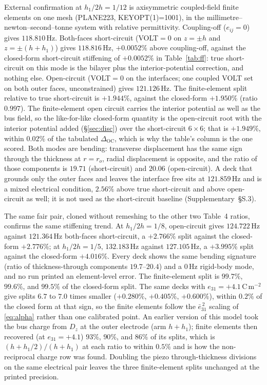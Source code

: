 \documentclass[11pt]{article}
\newcommand{\eebar}{\bar{e}_{31}}
\begin{document}
External confirmation at $h_1/2h=1/12$ is axisymmetric coupled-field
finite elements on one mesh (PLANE223, KEYOPT(1)=1001), in the
millimetre--newton--second--tonne system with relative permittivity.
Coupling-off ($e_{ij}=0$) gives $118.810\,\mathrm{Hz}$. Both-faces
short-circuit (VOLT$=0$ on $z=\pm h$ and $z=\pm(h+h_1)$) gives
$118.816\,\mathrm{Hz}$, $+0.0052\%$ above coupling-off, against the
closed-form short-circuit stiffening of $+0.0052\%$ in
Table~\ref{tab:ff}: true short-circuit on this mode is the bilayer plus
the interior-potential correction, and nothing else.
Open-circuit (VOLT$=0$ on the interfaces; one coupled VOLT set on both
outer faces, unconstrained) gives $121.126\,\mathrm{Hz}$. The
finite-element split relative to true short-circuit is $+1.944\%$,
against the closed-form $+1.950\%$ (ratio $0.997$). The finite-element
open circuit carries the interior potential as well as the bus field, so
the like-for-like closed-form quantity is the open-circuit root with the
interior potential added (\S\ref{sec:disc}) over the short-circuit
$6\times6$; that is $+1.949\%$, within $0.02\%$ of the tabulated
$\Delta_{\mathrm{OC}}$, which is why the table's column is the one
scored. Both modes are bending:
transverse displacement has the same sign through the thickness at
$r=r_o$, radial displacement is opposite, and the ratio of those
components is $19.71$ (short-circuit) and $20.06$ (open-circuit). A deck
that grounds only the outer faces and leaves the interface free sits at
$121.859\,\mathrm{Hz}$ and is a mixed electrical condition, $2.56\%$
above true short-circuit and above open-circuit as well; it is not used
as the short-circuit baseline (Supplementary~\S S.3).

The same fair pair, cloned without remeshing to the other two Table~4
ratios, confirms the same stiffening trend. At $h_1/2h=1/8$,
open-circuit gives $124.722\,\mathrm{Hz}$ against $121.364\,\mathrm{Hz}$
both-faces short-circuit, a $+2.766\%$ split against the closed-form
$+2.776\%$; at $h_1/2h=1/5$, $132.183\,\mathrm{Hz}$ against
$127.105\,\mathrm{Hz}$, a $+3.995\%$ split against the closed-form
$+4.016\%$. Every deck shows the same bending signature
(ratio of thickness-through components $19.7$--$20.4$) and a $0\,\mathrm{Hz}$
rigid-body mode, and no run printed an element-level error. The
finite-element split is $99.7\%$, $99.6\%$, and $99.5\%$ of the
closed-form split. The same decks with $e_{31}=+4.1\,\mathrm{C\,m^{-2}}$
give splits $6.7$ to $7.0$ times smaller ($+0.280\%$, $+0.405\%$, $+0.600\%$),
within $0.2\%$ of the closed form at that sign, so the finite elements
follow the $\eebar^{\,2}$ scaling of \eqref{eq:alpha} rather than one
calibrated point. An earlier version of this model took the bus charge
from $D_z$ at the outer electrode (arm $h+h_1$); finite elements then
recovered (at $e_{31}=+4.1$) $93\%$, $90\%$, and $86\%$ of its splits, which is
$(h+h_1/2)/(h+h_1)$ at each ratio to within $0.5\%$ and is how the
non-reciprocal charge row was found. Doubling the piezo through-thickness
divisions on the same electrical pair leaves the three finite-element
splits unchanged at the printed precision.
\end{document}
